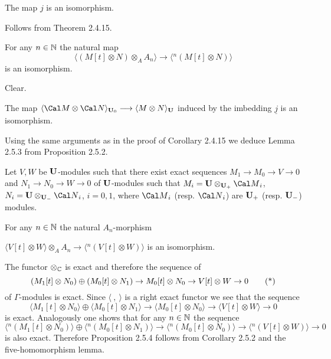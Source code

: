   The map $j$ is an isomorphism.
\endproclaim

  Follows from Theorem 2.4.15.
\enddemo

  For any  $n \in {\Bbb N}$  the natural map
$$
\langle (M[t] \otimes N) \otimes _A A_n\rangle \to \langle {}^n(M[t] \otimes
N)\rangle
$$
is an isomorphism.
\endproclaim

  Clear.
\enddemo


  The map $\langle  {\Cal M} \otimes {\Cal
N}\rangle_{{\bold U}_0}
\longrightarrow \langle M \otimes N\rangle_{\bold U}$  induced by the imbedding
$\underline{j}$  is an isomorphism.
\endproclaim

   Using the same arguments as in the proof of Corollary 2.4.15 we
deduce Lemma 2.5.3 from Proposition 2.5.2.
\enddemo

  Let  $V,W$  be ${\bold U}$-modules such that there exist
exact
sequences  $M_1 \to M_0 \to V \to 0$  and  $N_1 \to N_0 \to W \to 0$  of
${\bold U}$-modules such that  $M_i = {\bold U} \otimes_{{\bold U}_+} {\Cal
M}_i$,
$N_i = {\bold U} \otimes_{{\bold U}_-} {\Cal N}_i$,   $i = 0,1$, where
${\Cal M}_i$  (resp. ${\Cal N}_i$) are  ${\bold U}_+$  (resp. ${\bold U}_-$)
modules.

  For any  $n \in {\Bbb N}$  the natural
$A_n$-morphism

\noindent
$\langle V[t] \otimes W\rangle \otimes_A A_n \longrightarrow
\langle {}^n(V[t] \otimes W)\rangle$  is an isomorphism.
\endproclaim

  The functor  $\otimes_{\Bbb C}$  is exact and therefore
the sequence of
$$
(M_1[t] \otimes N_0) \oplus (M_0[t] \otimes N_1) \to M_0[t] \otimes N_0
\to V[t] \otimes W \to 0   \tag *
$$
of $\Gamma$-modules is exact.  Since  $\langle\ ,\ \rangle$  is a right exact
functor we see that the sequence
$$
\langle M_1[t] \otimes N_0\rangle \oplus \langle M_0[t] \otimes N_1\rangle
\longrightarrow \langle M_0[t] \otimes N_0\rangle \longrightarrow
\langle V[t] \otimes W\rangle \longrightarrow 0
$$
is exact.   Analogously one shows that for any $n \in {\Bbb N}$  the sequence
$$
\langle {}^n(M_1[t] \otimes N_0)\rangle \oplus \langle
{}^n(M_0[t] \otimes N_1)\rangle
\longrightarrow \langle {}^n(M_0[t] \otimes N_0)\rangle \longrightarrow
\langle {}^n(V[t] \otimes W)\rangle \longrightarrow 0
$$
is also exact.  Therefore Proposition 2.5.4 follows from Corollary 2.5.2 and
the
five-homomorphism lemma.

